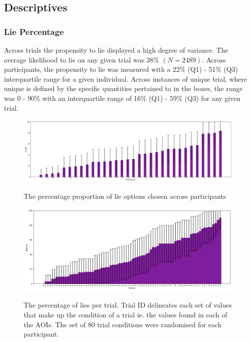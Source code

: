 \documentclass[man, floatsintext]{apa7}
\begin{document}
\subsection{Descriptives}

\subsubsection{Lie Percentage}

Across trials the propensity to lie displayed a high degree of variance. The average likelihood to lie on any given trial was 38\% $(N = 2489)$. Across participants, the propensity to lie was measured with a 22\% (Q1) - 51\% (Q3) interquartile range for a given individual. Across instances of unique trial, where unique is defined by the specific quantities pertained to in the boxes, the range was 0 - 90\% with an interquartile range of 16\% (Q1) - 59\% (Q3) for any given trial.

\begin{figure}[H]
	\includegraphics[width=\linewidth]{../plots/RESPONSE/PIDPercentLiesPlot.png}
	\label{fig:PIDPercentLiesPlot}
	\caption{The percentage proportion of lie options chosen across participants}
\end{figure}

\begin{figure}[H]
	\includegraphics[width=\linewidth]{../plots/RESPONSE/TRIALIDPercentLies.png}
	\label{fig:TRIALIDPercentLies}
	\caption{The percentage of lies per trial. Trial ID delineates each set of values that make up the condition of a trial ie. the values found in each of the AOIs. The set of 80 trial conditions were randomised for each participant.}
\end{figure}
\end{document}
